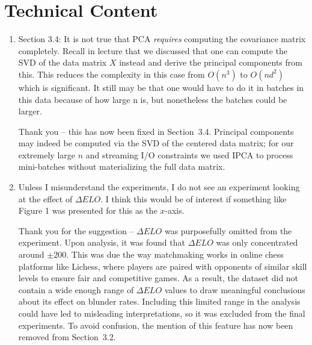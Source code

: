 \documentclass{amsart}
\theoremstyle{definition}
\theoremstyle{remark}
\numberwithin{equation}{section}
\begin{document}
    \section{Technical Content}
        \begin{enumerate}[label={(\arabic*)}]
            \item  Section 3.4: It is not true that PCA \textit{requires} computing the covariance matrix completely. Recall in lecture that we discussed that one can compute the SVD of the data matrix $X$ instead and derive the principal components from this. This reduces the complexity in this case from $O(n^3)$ to $O(nd^2)$ which is significant. It still may be that one would have to do it in batches in this data because of how large n is, but nonetheless the batches could be larger.

            {\color{gray}\small Thank you -- this has now been fixed in Section~3.4. Principal components may indeed be computed via the SVD of the centered data matrix; for our extremely large $n$ and streaming I/O constraints we used IPCA to process mini-batches without materializing the full data matrix.}
            
            \item Unless I misunderstand the experiments, I do not see an experiment looking at the effect of $\Delta ELO$. I think this would be of interest if something like Figure 1 was presented for this as the $x$-axis.
            
            {\color{gray}\small Thank you for the suggestion -- $\Delta ELO$ was purposefully omitted from the experiment. Upon analysis, it was found that $\Delta ELO$ was only concentrated around $\pm 200$. This was due the way matchmaking works in online chess platforms like Lichess, where players are paired with opponents of similar skill levels to ensure fair and competitive games. As a result, the dataset did not contain a wide enough range of $\Delta ELO$ values to draw meaningful conclusions about its effect on blunder rates. Including this limited range in the analysis could have led to misleading interpretations, so it was excluded from the final experiments. To avoid confusion, the mention of this feature has now been removed from Section~3.2.}
        \end{enumerate}
\end{document}
